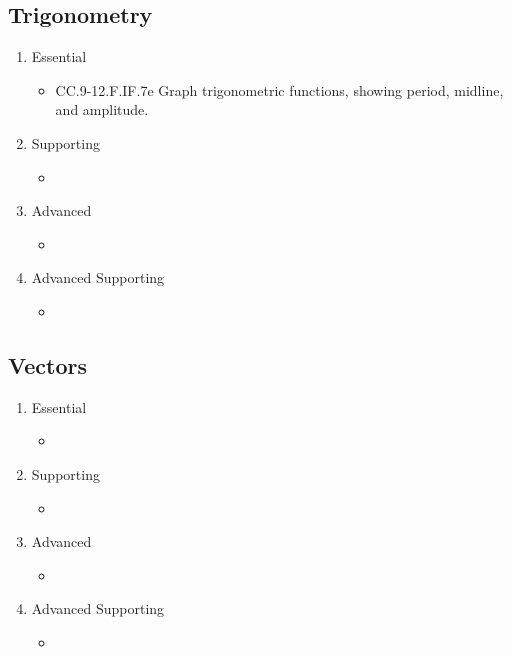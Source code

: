 \documentclass{article}
\begin{document}
\subsection*{Trigonometry}
\begin{enumerate}
	\item Essential
	\begin{itemize}
		\item CC.9-12.F.IF.7e Graph trigonometric functions, showing period, midline, and amplitude.
	\end{itemize}		
	\item Supporting
	\begin{itemize}
		\item
	\end{itemize}
	\item Advanced
	\begin{itemize}
		\item
	\end{itemize}
	\item Advanced Supporting
	\begin{itemize}
		\item
	\end{itemize}
\end{enumerate}
\subsection*{Vectors}
\begin{enumerate}
	\item Essential
	\begin{itemize}
		\item
	\end{itemize}		
	\item Supporting
	\begin{itemize}
		\item
	\end{itemize}
	\item Advanced
	\begin{itemize}
		\item
	\end{itemize}
	\item Advanced Supporting
	\begin{itemize}
		\item
	\end{itemize}
\end{enumerate}
\end{document}
